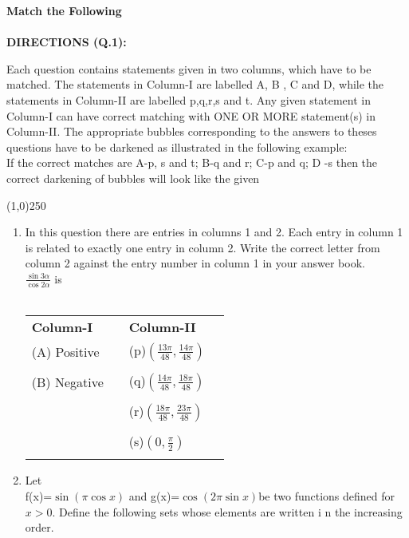 \begin{enumerate}[label=\arabic*.,ref=\thesubsection.\theenumi]
\begin{enumerate}
    \end{enumerate}
    {\Large\textbf{Match the Following}}\\\\
{\textbf{DIRECTIONS (Q.1):}}
\begin{textit}
{Each question contains statements given in two columns, which have to be matched. The statements in Column-I are labelled A, B , C and D, while the statements in Column-II are labelled p,q,r,s and t. Any given statement in Column-I can have correct matching with ONE OR MORE statement(s) in Column-II. The appropriate bubbles corresponding to the answers to theses questions have to be darkened as illustrated in the following example:\\
If the correct matches are A-p, s and t; B-q and r; C-p and q; D -s then the correct darkening of bubbles will look like the given} \end{textit}
\line(1,0){250}
\begin{enumerate}
    \item In this question there are entries in columns 1 and 2. Each entry in column 1 is related to exactly one entry in column 2. Write the correct letter from column 2 against the entry number in column 1 in your answer book.\\
{\Large{$\frac{\sin3\alpha}{\cos2\alpha}$}} is\\\\
\begin{tabular}{llll}
\textbf{Column-I} &   \enspace   &   \textbf{Column-II}\\
(A) Positive &   \enspace   &   (p)$({\frac{13\pi}{48}},{\frac{14\pi}{48}})$\\
&&&\\
(B) Negative    &   \enspace   & (q)$({\frac{14\pi}{48}},{\frac{18\pi}{48}})$\\
&&&\\
    &\enspace   &   (r)$({\frac{18\pi}{48}},{\frac{23\pi}{48}})$\\
&&&\\
  &\enspace  &   (s)$(0,{\frac{\pi}{2}})$\\
&&&\\
\end{tabular}
\item Let\\
f(x)=$\sin{(\pi \cos{x})}$ and g(x)=$\cos{(2\pi \sin{x})}$be two functions defined for $x>0$. Define the following sets whose elements are written i n the increasing order.\\\\

\end{enumerate}
\end{enumerate}
